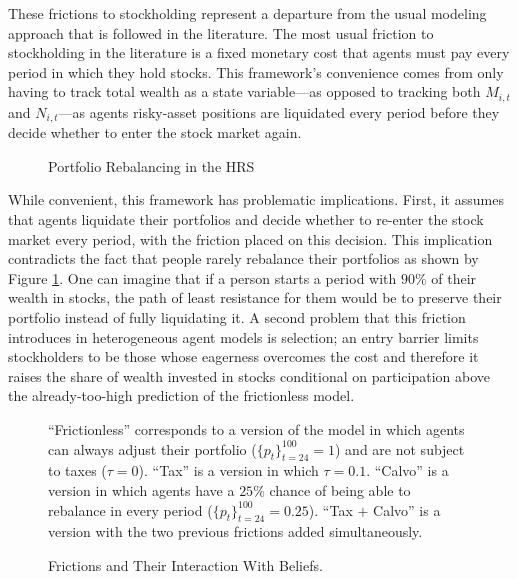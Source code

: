 \documentclass[./RiskyContrib.tex]{subfiles}
\begin{document}
These frictions to stockholding represent a departure from the usual modeling
approach that is followed in the literature. The most usual friction to
stockholding in the literature is a fixed monetary cost that agents must pay
every period in which they hold stocks. This framework's convenience comes from
only having to track total wealth as a state variable---as opposed to tracking
both $M_{i,t}$ and $N_{i,t}$---as agents risky-asset positions are liquidated
every period before they decide whether to enter the stock market again. 

\begin{figure}
\begin{center}
\end{center}
\caption{Portfolio Rebalancing in the HRS}\label{fig:rebalancing}
\end{figure}

While convenient, this framework has problematic implications. First, it assumes
that agents liquidate their portfolios and decide whether to re-enter the stock
market every period, with the friction placed on this decision. This implication
contradicts the fact that people rarely rebalance their portfolios as shown by 
Figure \ref{fig:rebalancing}. One can imagine that if a person starts a
period with $90\%$ of their wealth in stocks, the path of least resistance
for them would be to preserve their portfolio instead of fully liquidating it.
A second problem that this friction introduces in heterogeneous agent models
is selection; an entry barrier limits stockholders to be those whose eagerness
overcomes the cost and therefore it raises the share of wealth invested in stocks
conditional on participation above the already-too-high prediction of the
frictionless model.

\begin{figure}
\begin{center}
\end{center}
\scriptsize ``Frictionless'' corresponds to a version of the model in which
agents can always adjust their portfolio ($\{p_t\}_{t=24}^{100} = 1$) and are
not subject to taxes ($\tau = 0$). ``Tax'' is a version in which $\tau = 0.1$.
``Calvo'' is a version in which agents have a $25\%$ chance of being able to
rebalance in every period ($\{p_t\}_{t=24}^{100} = 0.25$). ``Tax $+$ Calvo''
is a version with the two previous frictions added simultaneously.

\caption{Frictions and Their Interaction With Beliefs.}\label{fig:frict_beliefs}
\end{figure}
\end{document}
